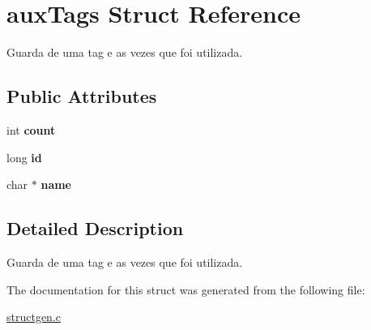 \hypertarget{structauxTags}{}\section{aux\+Tags Struct Reference}
\label{structauxTags}


Guarda de uma tag e as vezes que foi utilizada.  


\subsection*{Public Attributes}
\begin{DoxyCompactItemize}
\item 
int {\bfseries count}\hypertarget{structauxTags_a2ab7828952a16b481cb9eec24098c037}{}\label{structauxTags_a2ab7828952a16b481cb9eec24098c037}

\item 
long {\bfseries id}\hypertarget{structauxTags_af0e5effae793978dc72290f01fb6bd7e}{}\label{structauxTags_af0e5effae793978dc72290f01fb6bd7e}

\item 
char $\ast$ {\bfseries name}\hypertarget{structauxTags_a129dbdb90f37a458813280c3d165a363}{}\label{structauxTags_a129dbdb90f37a458813280c3d165a363}

\end{DoxyCompactItemize}


\subsection{Detailed Description}
Guarda de uma tag e as vezes que foi utilizada. 

The documentation for this struct was generated from the following file\+:\begin{DoxyCompactItemize}
\item 
\hyperlink{structgen_8c}{structgen.\+c}\end{DoxyCompactItemize}
